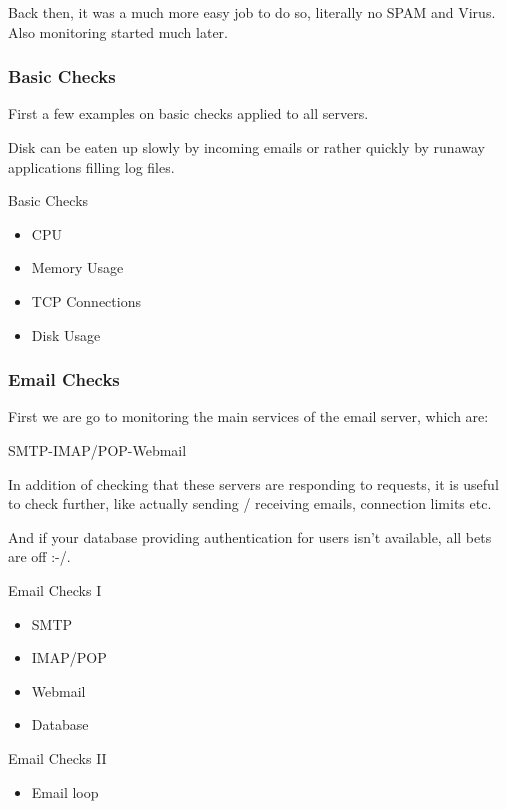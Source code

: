 Back then, it was a much more easy job to do
so, literally no SPAM and Virus. Also monitoring started much
later.

\subsubsection{Basic Checks}

First a few examples on basic checks applied to all servers.

Disk can be eaten up slowly by incoming emails or rather
quickly by runaway applications filling log files.

\begin{frame}{Basic Checks}
\begin{itemize}
\item CPU
\item Memory Usage
\item TCP Connections
\item Disk Usage
\end{itemize}
\end{frame}

\subsubsection{Email Checks}

First we are go to monitoring the main services of
the email server, which are:

SMTP-IMAP/POP-Webmail

In addition of checking that these servers
are responding to requests, it is useful to check
further, like actually sending / receiving emails,
connection limits etc.

And if your database providing authentication for
users isn't available, all bets are off :-/.

\begin{frame}{Email Checks I}
\begin{itemize}
\item SMTP
\item IMAP/POP
\item Webmail
\item Database
\end{itemize}
\end{frame}

\begin{frame}{Email Checks II}
\begin{itemize}
\item Email loop
\end{itemize}
\end{frame}

